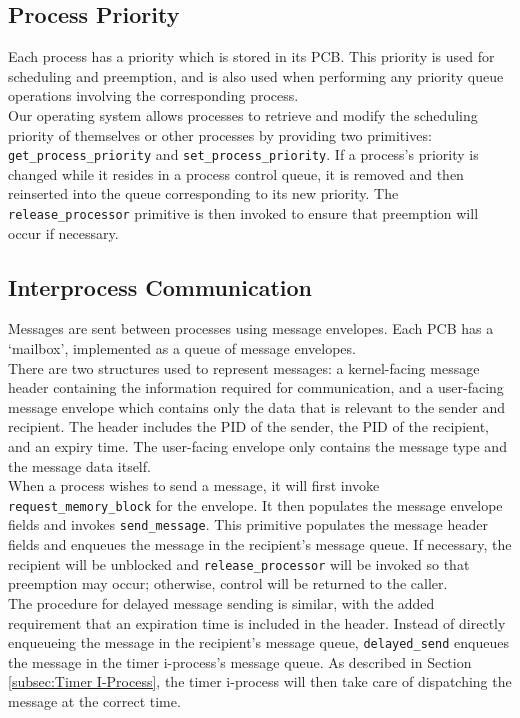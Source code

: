 \documentclass[12pt]{report}
\begin{document}
\subsection{Process Priority}

Each process has a priority which is stored in its PCB. This priority is used for scheduling and preemption, and is also used when performing any priority queue operations involving the corresponding process.\\

Our operating system allows processes to retrieve and modify the scheduling priority of themselves or other processes by providing two primitives: \texttt{get_process_priority} and \texttt{set_process_priority}. If a process's priority is changed while it resides in a process control queue, it is removed and then reinserted into the queue corresponding to its new priority. The \texttt{release_processor} primitive is then invoked to ensure that preemption will occur if necessary.

\subsection{Interprocess Communication}

Messages are sent between processes using message envelopes. Each PCB has a `mailbox', implemented as a queue of message envelopes.\\

There are two structures used to represent messages: a kernel-facing message header containing the information required for communication, and a user-facing message envelope which contains only the data that is relevant to the sender and recipient. The header includes the PID of the sender, the PID of the recipient, and an expiry time. The user-facing envelope only contains the message type and the message data itself.\\

When a process wishes to send a message, it will first invoke \texttt{request_memory_block} for the envelope. It then populates the message envelope fields and invokes \texttt{send_message}. This primitive populates the message header fields and enqueues the message in the recipient's message queue. If necessary, the recipient will be unblocked and \texttt{release_processor} will be invoked so that preemption may occur; otherwise, control will be returned to the caller.\\

The procedure for delayed message sending is similar, with the added requirement that an expiration time is included in the header. Instead of directly enqueueing the message in the recipient's message queue, \texttt{delayed_send} enqueues the message in the timer i-process's message queue. As described in Section \ref{subsec:Timer I-Process}, the timer i-process will then take care of dispatching the message at the correct time.\\
\end{document}
